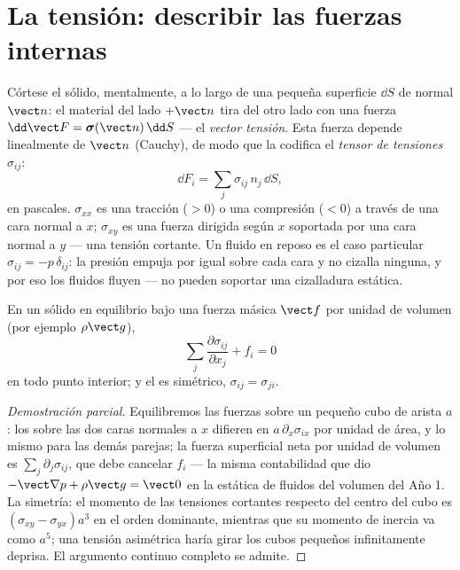 \section{La tensión: describir las fuerzas internas}

\begin{definition}\label{def:b3:continuum-elasticity:stress}
Córtese el sólido, mentalmente, a lo largo de una pequeña superficie $\dd S$
de normal $\vect n$: el material del lado $+\vect n$ tira del otro lado con
una fuerza $\dd\vect F = \boldsymbol\sigma(\vect n)\,\dd S$ --- el
\emph{vector tensión}. Esta fuerza depende linealmente de $\vect n$
(Cauchy), de modo que la codifica el \emph{tensor de tensiones}
$\sigma_{ij}$:
\[
\dd F_i = \sum_j \sigma_{ij}\,n_j\,\dd S ,
\]
en pascales. $\sigma_{xx}$ es una tracción ($> 0$) o una compresión ($< 0$)
a través de una cara normal a $x$; $\sigma_{xy}$ es una fuerza dirigida
según $x$ soportada por una cara normal a $y$ --- una tensión cortante. Un
fluido en reposo es el caso particular $\sigma_{ij} = -p\,\delta_{ij}$: la
presión empuja por igual sobre cada cara y no cizalla ninguna, y por eso los
fluidos fluyen --- no pueden soportar una cizalladura estática.
\end{definition}

\begin{proposition}\label{prop:b3:continuum-elasticity:equilibrium}
En un sólido en equilibrio bajo una fuerza másica $\vect f$ por unidad de
volumen (por ejemplo $\rho\vect g$),
\[
\sum_j\frac{\partial\sigma_{ij}}{\partial x_j} + f_i = 0
\]
en todo punto interior; y el  es simétrico,
$\sigma_{ij} = \sigma_{ji}$.
\end{proposition}

\begin{proof}[Demostración parcial]
Equilibremos las fuerzas sobre un pequeño cubo de arista $a$: los  sobre las dos caras normales a $x$ difieren en
$a\,\partial_x\sigma_{ix}$ por unidad de área, y lo mismo para las demás
parejas; la fuerza superficial neta por unidad de volumen es
$\sum_j\partial_j\sigma_{ij}$, que debe cancelar $f_i$ --- la misma
contabilidad que dio $-\vect\nabla p + \rho\vect g = \vect 0$
en la estática de fluidos del volumen del Año 1. La simetría: el momento de
las tensiones cortantes respecto del centro del cubo es $(\sigma_{xy} -
\sigma_{yx})a^3$ en el orden dominante, mientras que su momento de inercia
va como $a^5$; una tensión asimétrica haría girar los cubos pequeños
infinitamente deprisa. El argumento continuo completo se admite.
\end{proof}

